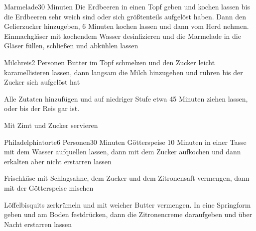 \documentclass{book}
\begin{document}

\begin{recipe}{Marmelade}{}{30 Minuten}
Die Erdbeeren in einen Topf geben und kochen lassen bis die Erdbeeren sehr weich sind oder sich größtenteils aufgelöst haben. Dann den Gelierzucker hinzugeben, 6 Minuten kochen lassen und dann vom Herd nehmen. Einmachgläser mit kochendem Wasser desinfizieren und die Marmelade in die Gläser füllen, schließen und abkühlen lassen
\end{recipe}


\begin{recipe}{Milchreis}{2 Personen}{}
Butter im Topf schmelzen und den Zucker leicht karamellisieren lassen, dann langsam die Milch hinzugeben und rühren bis der Zucker sich aufgelöst hat

Alle Zutaten hinzufügen und auf niedriger Stufe etwa 45 Minuten ziehen lassen, oder bis der Reis gar ist.

Mit Zimt und Zucker servieren
\end{recipe}


\begin{recipe}{Philadelphiatorte}{6 Personen}{30 Minuten}
Götterspeise 10 Minuten in einer Tasse mit dem Wasser aufquellen lassen, dann mit dem Zucker aufkochen und dann erkalten aber nicht erstarren lassen

Frischkäse mit Schlagsahne, dem Zucker und dem Zitronensaft vermengen, dann mit der Götterspeise mischen

Löffelbisquits zerkrümeln und mit weicher Butter vermengen.
In eine Springform geben und am Boden festdrücken, dann die Zitronencreme daraufgeben und über Nacht erstarren lassen
\end{recipe}
\end{document}

